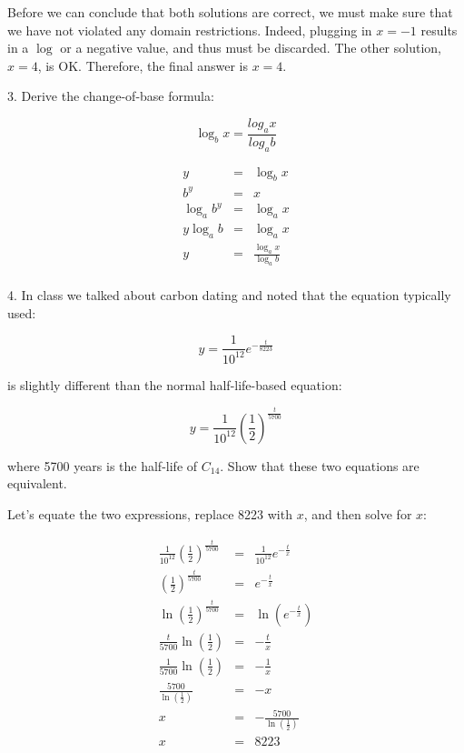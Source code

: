 \documentclass[letterpaper, 12pt]{article}
\begin{document}
Before we can conclude that both solutions are correct, we must make sure that
we have not violated any domain restrictions.  Indeed, plugging in $x=-1$
results in a $\log$ or a negative value, and thus must be discarded.  The
other solution, $x=4$, is OK.  Therefore, the final answer is $x=4$.

\bigskip

3. Derive the change-of-base formula:

\[\log_{b}x=\frac{log_a x}{log_a b}\]

\begin{eqnarray*}
y &=& \log_{b}x \\
b^y &=& x \\
\log_{a}b^y &=& \log_{a}x \\
y\log_{a}b &=& \log_{a}x \\
y &=& \frac{\log_{a}x}{\log_{a}b} \\
\end{eqnarray*}

4. In class we talked about carbon dating and noted that the equation typically
used:

\[y=\frac{1}{10^{12}}e^{-\frac{t}{8223}}\]

is slightly different than the normal half-life-based equation:

\[y=\frac{1}{10^{12}}\left(\frac{1}{2}\right)^{\frac{t}{5700}}\]

where 5700 years is the half-life of $C_{14}$. Show that these two equations are
equivalent.

\bigskip

Let's equate the two expressions, replace 8223 with $x$, and then solve for
$x$:

\begin{eqnarray*}
\frac{1}{10^{12}}\left(\frac{1}{2}\right)^{\frac{t}{5700}} &=&
    \frac{1}{10^{12}}e^{-\frac{t}{x}} \\
\left(\frac{1}{2}\right)^{\frac{t}{5700}} &=& e^{-\frac{t}{x}} \\
\ln\left(\frac{1}{2}\right)^{\frac{t}{5700}} &=& \ln\left(e^{-\frac{t}{x}}\right) \\
\frac{t}{5700}\ln\left(\frac{1}{2}\right) &=& -\frac{t}{x} \\
\frac{1}{5700}\ln\left(\frac{1}{2}\right) &=& -\frac{1}{x} \\
\frac{5700}{\ln\left(\frac{1}{2}\right)} &=& -x \\
x &=& -\frac{5700}{\ln\left(\frac{1}{2}\right)} \\
x &=& 8223 \\
\end{eqnarray*}
\end{document}
